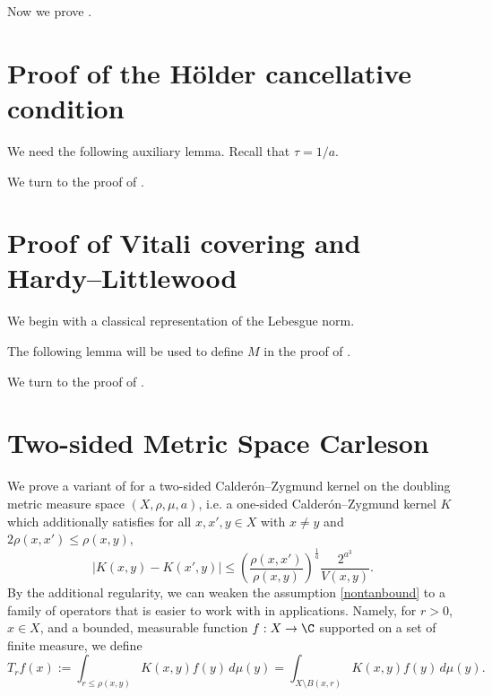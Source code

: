 Now we prove .



\section{Proof of the H\"older cancellative condition}
\label{liphoel}

We need the following auxiliary lemma.
Recall that $\tau = 1/a$.






We turn to the proof of .


\section{Proof of Vitali covering and Hardy--Littlewood}
\label{sec-hlm}


We begin with a classical representation of the Lebesgue norm.


The following lemma will be used to define $M$ in the proof of .



We turn to the proof of .


\section{Two-sided Metric Space Carleson}

We prove a variant of  for a two-sided Calder\'on--Zygmund kernel on the doubling metric measure space $(X,\rho,\mu,a)$, i.e. a one-sided Calder\'on--Zygmund kernel $K$ which additionally satisfies for all $x,x',y\in X$ with $x\neq y$ and $2\rho(x,x') \leq \rho(x,y)$,
\begin{equation}
    \label{eqkernel-x-smooth}
    |K(x,y) - K(x',y)| \leq \left(\frac{\rho(x,x')}{\rho(x,y)}\right)^{\frac{1}{a}}\frac{2^{a^3}}{V(x,y)}.
\end{equation}
By the additional regularity, we can weaken the assumption \eqref{nontanbound} to a family of operators that is easier to work with in applications.
Namely, for $r > 0$, $x\in X$, and a bounded, measurable function $f:X\to\C$ supported on a set of finite measure, we define
\begin{equation}
\label{def-T-r}
T_r f(x):= \int_{r\le\rho(x,y)} K(x,y) f(y) \, d\mu(y) = \int_{X\setminus B(x,r)} K(x,y) f(y) \, d\mu(y).
\end{equation}

